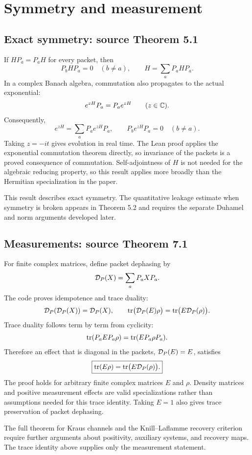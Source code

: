 \section{Symmetry and measurement}\label{supp1:section:002}
\subsection{Exact symmetry: source Theorem 5.1}
If $HP_a=P_aH$ for every packet, then
\[
P_bHP_a=0\quad(b\ne a),\qquad H=\sum_aP_aHP_a.
\]
In a complex Banach algebra, commutation also propagates to the actual exponential:
\[
e^{zH}P_a=P_ae^{zH}\qquad(z\in\C).
\]
Consequently,
\[
e^{zH}=\sum_aP_ae^{zH}P_a,
\qquad P_be^{zH}P_a=0\quad(b\ne a).
\]
Taking $z=-it$ gives evolution in real time. The Lean proof applies the exponential commutation theorem directly, so invariance of the packets is a proved consequence of commutation. Self-adjointness of $H$ is not needed for the algebraic reducing property, so this result applies more broadly than the Hermitian specialization in the paper.



This result describes exact symmetry. The quantitative leakage estimate when symmetry is broken appears in Theorem 5.2 and requires the separate Duhamel and norm arguments developed later.

\subsection{Measurements: source Theorem 7.1}
For finite complex matrices, define packet dephasing by
\[
\deph(X)=\sum_aP_aXP_a.
\]
The code proves idempotence and trace duality:
\[
\deph(\deph(X))=\deph(X),\qquad
\tr\bigl(\deph(E)\rho\bigr)=\tr\bigl(E\deph(\rho)\bigr).
\]
Trace duality follows term by term from cyclicity:
\[
\operatorname{tr}(P_aEP_a\rho)=\operatorname{tr}(EP_a\rho P_a).
\]
Therefore an effect that is diagonal in the packets, $\deph(E)=E$, satisfies
\[
\boxed{\tr(E\rho)=\tr\bigl(E\deph(\rho)\bigr).}
\]
The proof holds for arbitrary finite complex matrices $E$ and $\rho$. Density matrices and positive measurement effects are valid specializations rather than assumptions needed for this trace identity. Taking $E=1$ also gives trace preservation of packet dephasing.



The full theorem for Kraus channels and the Knill--Laflamme recovery criterion require further arguments about positivity, auxiliary systems, and recovery maps. The trace identity above supplies only the measurement statement.



